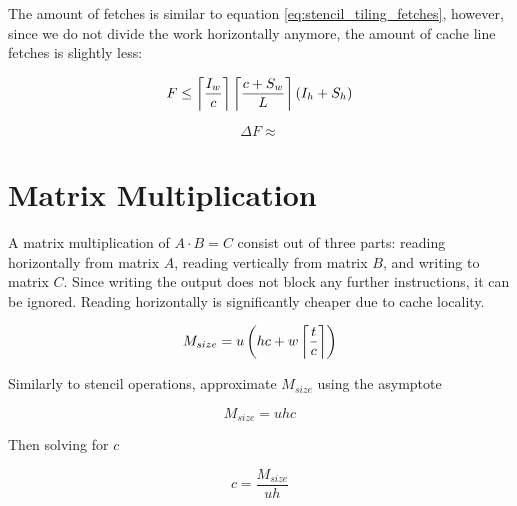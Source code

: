 The amount of fetches is similar to equation \ref{eq:stencil_tiling_fetches}, however, since we do not divide the work horizontally anymore, the amount of cache line fetches is slightly less:

\begin{equation}
    F \leq \left\lceil \frac{I_w}{c} \right\rceil\left\lceil \frac{c + S_w}{L} \right\rceil (I_h + S_h)
    \label{eq:stencil_column_fetches}
\end{equation}

\begin{equation}
    \Delta F \approx  
\end{equation}


\section{Matrix Multiplication}


A matrix multiplication of $A \cdot B = C$ consist out of three parts: reading horizontally from matrix $A$, reading vertically from matrix $B$, and writing to matrix $C$.
Since writing the output does not block any further instructions, it can be ignored.
Reading horizontally is significantly cheaper due to cache locality.

\[
    M_{size} = u \left(h c + w \left\lceil \frac{t}{c} \right\rceil\right)
\]

Similarly to stencil operations, approximate $M_{size}$ using the asymptote

\[
    M_{size} = u h c 
\]

Then solving for $c$

\[
    c = \frac{M_{size}}{u h}
\]

